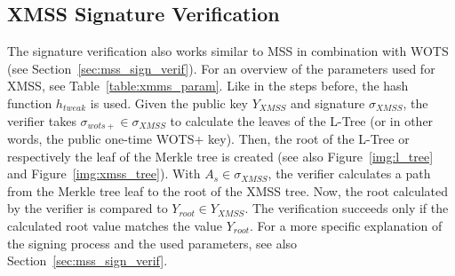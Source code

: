 \subsection{XMSS Signature Verification}
The signature verification also works similar to MSS in combination with WOTS (see Section~\ref{sec:mss_sign_verif}). For an overview of the parameters used for XMSS, see Table~\ref{table:xmms_param}.
 Like in the steps before, the hash function $h_{tweak}$ is used.
Given the public key $Y_{XMSS}$ and signature $\sigma_{XMSS}$, the verifier takes $\sigma_{wots+} \in \sigma_{XMSS}$ to calculate the leaves of the L-Tree (or in other words, the public one-time WOTS+ key). Then, the root of the L-Tree or respectively the leaf of the Merkle tree is created (see also Figure~\ref{img:l_tree} and Figure~\ref{img:xmss_tree}). With $A_s \in \sigma_{XMSS}$, the verifier calculates a path from the Merkle tree leaf to the root of the XMSS tree. Now, the root calculated by the verifier is compared to $Y_{root} \in Y_{XMSS}$. The verification succeeds only if the calculated root value matches the value $Y_{root}$.
For a more specific explanation of the signing process and the used parameters, see also Section~\ref{sec:mss_sign_verif}.

